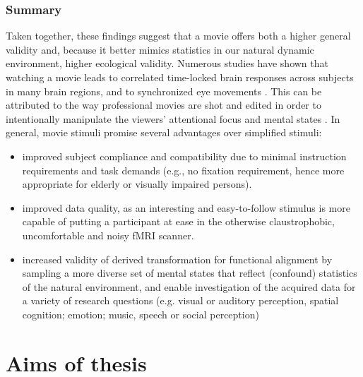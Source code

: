 \subsubsection{Summary}
%
Taken together, these findings suggest that a movie offers both a higher general
validity and, because it better mimics statistics in our natural dynamic
environment, higher ecological validity.
%
Numerous studies have shown that watching a movie leads to correlated
time-locked brain responses across subjects in many brain regions, and to
synchronized eye movements \citep{hasson2010reliability, lankinen2014isc-meg}.
%
This can be attributed to the way professional movies are shot and edited in
order to intentionally manipulate the viewers' attentional focus and mental
states \citep{brown2012cinematography, dancyger2011film-technique}.
%
In general, movie stimuli promise several advantages over simplified stimuli:

\begin{itemize}
    \item improved subject compliance and compatibility due to
            minimal instruction requirements and task demands (e.g., no fixation
            requirement, hence more appropriate for elderly or visually impaired
        persons).
    \item improved data quality, as an interesting and
            easy-to-follow stimulus is more capable of putting a participant at
            ease in the otherwise claustrophobic, uncomfortable and noisy fMRI
        scanner.
    \item increased validity of derived transformation for
            functional alignment by sampling a more diverse set of mental states
            that reflect (confound) statistics of the natural environment, and
            enable investigation of the acquired data for a variety of research
            questions (e.g. visual or auditory perception, spatial cognition;
            emotion; music, speech or social perception)
\end{itemize}


\section{Aims of thesis}


